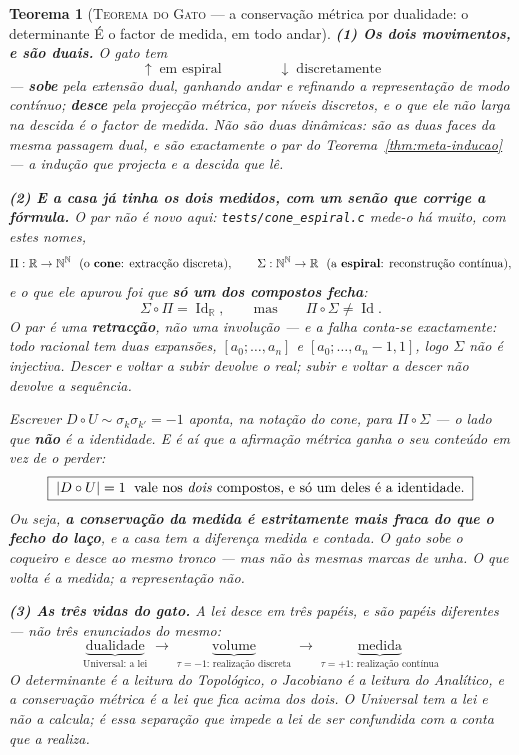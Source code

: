 \documentclass[11pt,a4paper]{article}
\newtheorem{teorema}{Teorema}
\newcommand{\code}[1]{\texttt{\small #1}}
\begin{document}
\begin{teorema}[\textsc{Teorema do Gato} --- a conservação métrica por
dualidade: o determinante É o factor de medida, em todo
andar]
\textbf{(1) Os dois movimentos, e são duais.} O gato tem
\[
\boxed{\;\uparrow\;\text{em espiral}
\qquad\qquad
\downarrow\;\text{discretamente}\;}
\]
--- \textbf{sobe} pela extensão dual, ganhando andar e refinando a
representação de modo \emph{contínuo}; \textbf{desce} pela projecção
métrica, por níveis \emph{discretos}, e o que ele não larga na descida é
o factor de medida. Não são duas dinâmicas: são as duas faces da mesma
passagem dual, e são exactamente o par do
Teorema~\ref{thm:meta-inducao} --- a indução que projecta e a descida que
lê.

\textbf{(2) E a casa já tinha os dois medidos, com um senão que corrige
a fórmula.} O par não é novo aqui: \code{tests/cone\_espiral.c} mede-o há
muito, com estes nomes,
\[
\Pi:\mathbb{R}\to\mathbb{N}^{\mathbb{N}}\ \ (\text{o \textbf{cone}:
extracção discreta}),
\qquad
\Sigma:\mathbb{N}^{\mathbb{N}}\to\mathbb{R}\ \ (\text{a \textbf{espiral}:
reconstrução contínua}),
\]
e o que ele apurou foi que \textbf{só um dos compostos fecha}:
\[
\Sigma\circ\Pi=\operatorname{Id}_{\mathbb{R}},
\qquad\text{mas}\qquad
\Pi\circ\Sigma\neq\operatorname{Id}.
\]
O par é uma \textbf{retracção}, não uma involução --- e a falha conta-se
exactamente: todo racional tem \emph{duas} expansões,
$[a_{0};\ldots,a_{n}]$ e $[a_{0};\ldots,a_{n}-1,1]$, logo $\Sigma$ não é
injectiva. Descer e voltar a subir devolve o real; subir e voltar a
descer \emph{não} devolve a sequência.

Escrever $D\circ U\sim\sigma_{k}\sigma_{k'}=-1$ aponta, na notação do
cone, para $\Pi\circ\Sigma$ --- o lado que \textbf{não} é a identidade. E
é aí que a afirmação métrica ganha o seu conteúdo em vez de o perder:
\[
\boxed{\;|D\circ U|=1\;\text{ vale nos \emph{dois} compostos, e só um
deles é a identidade.}\;}
\]
Ou seja, \textbf{a conservação da medida é estritamente mais fraca do que
o fecho do laço}, e a casa tem a diferença medida e contada. O gato sobe
o coqueiro e desce ao mesmo tronco --- mas não às mesmas marcas de unha.
O que volta é a \emph{medida}; a representação não.

\textbf{(3) As três vidas do gato.} A lei desce em três papéis, e são
papéis \emph{diferentes} --- não três enunciados do mesmo:
\[
\boxed{\;
\underbrace{\text{dualidade}}_{\text{Universal: a lei}}
\;\longrightarrow\;
\underbrace{\text{volume}}_{\text{$\tau=-1$: realização discreta}}
\;\longrightarrow\;
\underbrace{\text{medida}}_{\text{$\tau=+1$: realização contínua}}\;}
\]
O determinante é a leitura do Topológico, o Jacobiano é a leitura do Analítico, e a
conservação métrica é a lei que fica acima dos dois. O Universal tem a
lei e \emph{não a calcula}; é essa separação que impede a lei de ser
confundida com a conta que a realiza.


\end{teorema}
\end{document}
